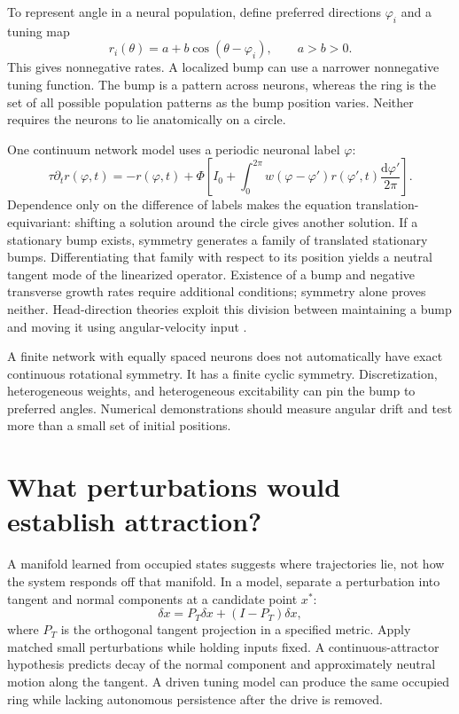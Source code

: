 To represent angle in a neural population, define preferred directions $\varphi_i$ and a tuning map
\begin{equation}
 r_i(\theta)=a+b\cos(\theta-\varphi_i),\qquad a>b>0.
 \label{eq:07-cosine-code}
\end{equation}
This gives nonnegative rates. A localized bump can use a narrower nonnegative tuning function. The bump is a pattern across neurons, whereas the ring is the set of all possible population patterns as the bump position varies. Neither requires the neurons to lie anatomically on a circle.

One continuum network model uses a periodic neuronal label $\varphi$:
\begin{equation}
 \tau\partial_t r(\varphi,t)=-r(\varphi,t)+
 \Phi\!\left[I_0+\int_0^{2\pi}w(\varphi-\varphi')
                      r(\varphi',t)\frac{\mathrm d\varphi'}{2\pi}\right].
 \label{eq:07-neural-field}
\end{equation}
Dependence only on the difference of labels makes the equation translation-equivariant: shifting a solution around the circle gives another solution. If a stationary bump exists, symmetry generates a family of translated stationary bumps. Differentiating that family with respect to its position yields a neutral tangent mode of the linearized operator. Existence of a bump and negative transverse growth rates require additional conditions; symmetry alone proves neither. Head-direction theories exploit this division between maintaining a bump and moving it using angular-velocity input \citep{app_zhang1996}.

\begin{misconception}
A finite network with equally spaced neurons does not automatically have exact continuous rotational symmetry. It has a finite cyclic symmetry. Discretization, heterogeneous weights, and heterogeneous excitability can pin the bump to preferred angles. Numerical demonstrations should measure angular drift and test more than a small set of initial positions.
\end{misconception}

\section{What perturbations would establish attraction?}
A manifold learned from occupied states suggests where trajectories lie, not how the system responds off that manifold. In a model, separate a perturbation into tangent and normal components at a candidate point $x^*$:
\[
 \delta x=P_T\delta x+(I-P_T)\delta x,
\]
where $P_T$ is the orthogonal tangent projection in a specified metric. Apply matched small perturbations while holding inputs fixed. A continuous-attractor hypothesis predicts decay of the normal component and approximately neutral motion along the tangent. A driven tuning model can produce the same occupied ring while lacking autonomous persistence after the drive is removed.

